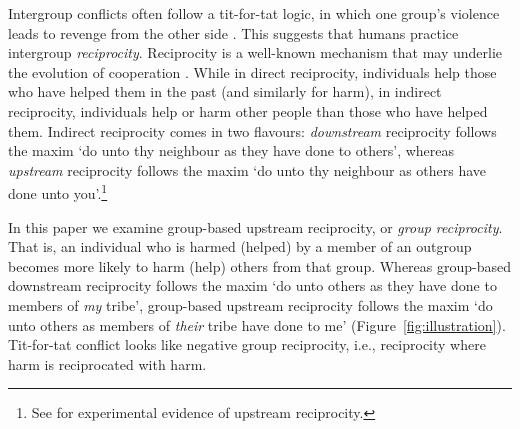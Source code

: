 \documentclass[12pt,a4paper]{article}\usepackage[]{graphicx}\usepackage[]{color}
\begin{document}
Intergroup conflicts often follow a tit-for-tat logic, in which one group's
violence leads to revenge from the other side
\citep{horowitz2001thedeadly,horowitz1985ethnicgroups,chagnon1988lifehistories,haushofer_both_2010,shayo2010judicial}.
This suggests that humans practice intergroup \emph{reciprocity}. Reciprocity is
a well-known mechanism that may underlie the evolution of cooperation
\citep{nowak2006five,nowak2012evolving}. While in direct reciprocity,
individuals help those who have helped them in the past (and similarly for
harm), in indirect reciprocity, individuals help or harm other people than those
who have helped them.  Indirect reciprocity comes in two flavours:
\emph{downstream} reciprocity follows the maxim `do unto thy neighbour as they
have done to others', whereas \emph{upstream} reciprocity follows the maxim `do
unto thy neighbour as others have done unto you'.\footnote{
See \citet{greiner2005indirect,tsvetkova2015social,tsvetkova2014social,guth2001trust} for experimental evidence of upstream reciprocity.
}

In this paper we examine
group-based upstream reciprocity, or \emph{group reciprocity}. That is, an
individual who is harmed (helped) by a member of an outgroup becomes more likely
to harm (help) others from that group.  Whereas group-based downstream
reciprocity \citep{bernhard2006group,bernhard2006parochial} follows the maxim
`do unto others as they have done to members of \emph{my} tribe', group-based
upstream reciprocity follows the maxim `do unto others as members of
\emph{their} tribe have done to me' (Figure~\ref{fig:illustration}). Tit-for-tat conflict looks like 
negative group reciprocity, i.e., reciprocity where harm is reciprocated with harm.
\end{document}
